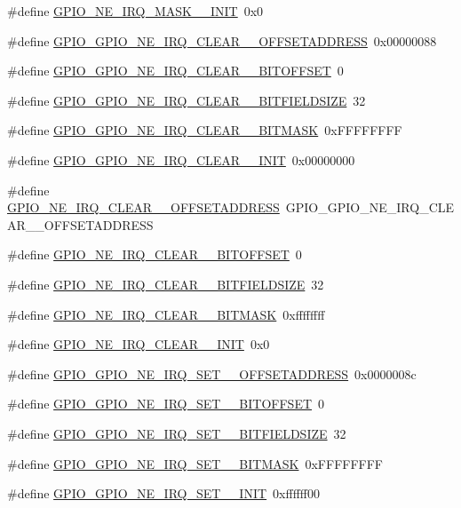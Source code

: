 \begin{DoxyCompactItemize}
\#define \hyperlink{a00553_a3f14b8bce304288ec65a58a5d9d4e576}{GPIO\_\-NE\_\-IRQ\_\-MASK\_\_\-INIT}~0x0
\item 
\#define \hyperlink{a00553_a66d11581afcc078e9c577486d9e57433}{GPIO\_\-GPIO\_\-NE\_\-IRQ\_\-CLEAR\_\_\-OFFSETADDRESS}~0x00000088
\item 
\#define \hyperlink{a00553_a62d3f02962f0ffa8191b8064d8e8af03}{GPIO\_\-GPIO\_\-NE\_\-IRQ\_\-CLEAR\_\_\-BITOFFSET}~0
\item 
\#define \hyperlink{a00553_a965d737b1373798de2f1c080dfce38e1}{GPIO\_\-GPIO\_\-NE\_\-IRQ\_\-CLEAR\_\_\-BITFIELDSIZE}~32
\item 
\#define \hyperlink{a00553_ae8cd34bf63c938b025aff7ee80702b48}{GPIO\_\-GPIO\_\-NE\_\-IRQ\_\-CLEAR\_\_\-BITMASK}~0xFFFFFFFF
\item 
\#define \hyperlink{a00553_aaa5688682c216183cf9bb656a0ef9a3a}{GPIO\_\-GPIO\_\-NE\_\-IRQ\_\-CLEAR\_\_\-INIT}~0x00000000
\item 
\#define \hyperlink{a00553_aaebe7f654a6b50e0bbe759852156fb0a}{GPIO\_\-NE\_\-IRQ\_\-CLEAR\_\_\-OFFSETADDRESS}~GPIO\_\-GPIO\_\-NE\_\-IRQ\_\-CLEAR\_\_\-OFFSETADDRESS
\item 
\#define \hyperlink{a00553_a6305fa4a3da8d5ead2db37e3c2d77354}{GPIO\_\-NE\_\-IRQ\_\-CLEAR\_\_\-BITOFFSET}~0
\item 
\#define \hyperlink{a00553_af1c0be2efac66cd3c09ce9e2b994190e}{GPIO\_\-NE\_\-IRQ\_\-CLEAR\_\_\-BITFIELDSIZE}~32
\item 
\#define \hyperlink{a00553_ad7453c86198e17bbbfd1e2b9add0a5df}{GPIO\_\-NE\_\-IRQ\_\-CLEAR\_\_\-BITMASK}~0xffffffff
\item 
\#define \hyperlink{a00553_a78fdf3a88618f2b7f0d4b6007762b5c5}{GPIO\_\-NE\_\-IRQ\_\-CLEAR\_\_\-INIT}~0x0
\item 
\#define \hyperlink{a00553_a4609495111a70a2da753b2343b06f69e}{GPIO\_\-GPIO\_\-NE\_\-IRQ\_\-SET\_\_\-OFFSETADDRESS}~0x0000008c
\item 
\#define \hyperlink{a00553_a2ab179d799b06e6d890232c6daf7c34b}{GPIO\_\-GPIO\_\-NE\_\-IRQ\_\-SET\_\_\-BITOFFSET}~0
\item 
\#define \hyperlink{a00553_a0e47978c9dda98055009a3ea3eb7d392}{GPIO\_\-GPIO\_\-NE\_\-IRQ\_\-SET\_\_\-BITFIELDSIZE}~32
\item 
\#define \hyperlink{a00553_afbdb445a60b6df4d8bc51de9e004bcd3}{GPIO\_\-GPIO\_\-NE\_\-IRQ\_\-SET\_\_\-BITMASK}~0xFFFFFFFF
\item 
\#define \hyperlink{a00553_aa7a28403499bd1b954fca98111cebdce}{GPIO\_\-GPIO\_\-NE\_\-IRQ\_\-SET\_\_\-INIT}~0xffffff00

\end{DoxyCompactItemize}
